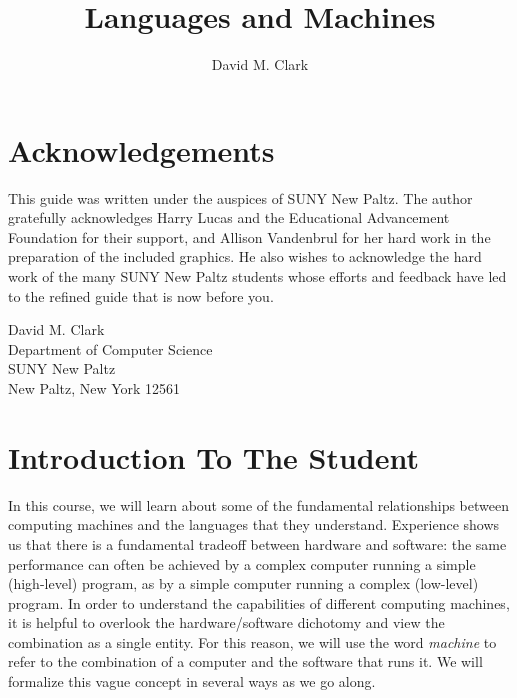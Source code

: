 \documentclass{article}
\let\titlepageAuthor\author
\renewcommand{\author}[1]{\newcommand{\headerAuthor}{#1}\titlepageAuthor{#1}}
\let\titlepageTitle\title
\renewcommand{\title}[1]{\newcommand{\headerTitle}{#1}\titlepageTitle{#1}}
\begin{document}
\title{Languages and Machines}
\author{David M. Clark}
\date{ }
\maketitle
\thispagestyle{empty}



\newpage

\setcounter{tocdepth}{3} 
\tableofcontents
\thispagestyle{empty}


\newpage

\section*{Acknowledgements}


This guide was written under the auspices of SUNY New Paltz. The author gratefully acknowledges Harry Lucas and the Educational Advancement Foundation for their support, and Allison Vandenbrul for her hard work in the preparation of the included graphics. He also wishes to acknowledge the hard work of the many SUNY New Paltz students whose efforts and feedback have led to the refined guide that is now before you.

\begin{flushright}
David M. Clark \\
Department of Computer Science \\
SUNY New Paltz \\
New Paltz, New York 12561
\end{flushright}



\newpage

\section*{Introduction To The Student}

In this course, we will learn about some of the fundamental relationships between computing machines and the languages that they understand. Experience shows us that there is a fundamental tradeoff between hardware and software: the same performance can often be achieved by a complex computer running a simple (high-level) program, as by a simple computer running a complex (low-level) program.  In order to understand the capabilities of different computing machines, it is helpful to overlook the hardware/software dichotomy and view the combination as a single entity. For this reason, we will use the word \emph{machine} to refer to the combination of a computer and the software that runs it. We will formalize this vague concept in several ways as we go along.
\end{document}
